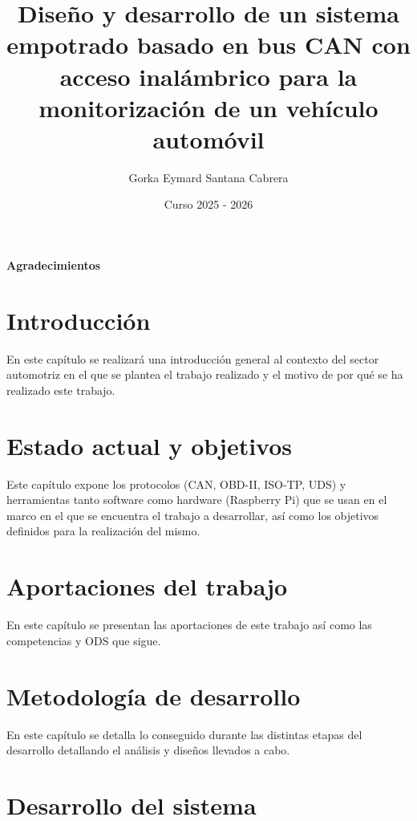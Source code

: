 \documentclass[oneside,12pt]{book}
\title{Diseño y desarrollo de un sistema empotrado basado en bus CAN con acceso inalámbrico para la monitorización de un vehículo automóvil}
\author{Gorka Eymard Santana Cabrera}
\date{Curso 2025 - 2026}
\begin{document}




\newpage
{}
{\Large{\textbf{Agradecimientos}}}


\clearpage

\tableofcontents

\lstlistoflistings
\listofalgorithms

\listoffigures

\listoftables


\clearpage
{}

\chapter{Introducción}
En este capítulo se realizará una introducción general al contexto del sector automotriz en el que se plantea el trabajo realizado y el motivo de por qué se ha realizado este trabajo.


\chapter{Estado actual y objetivos}
Este capítulo expone los protocolos (CAN, OBD-II, ISO-TP, UDS) y herramientas tanto software como hardware (Raspberry Pi) que se usan en el marco en el que se encuentra el trabajo a desarrollar, así como los objetivos definidos para la realización del mismo.


\chapter{Aportaciones del trabajo}
En este capítulo se presentan las aportaciones de este trabajo así como las competencias y ODS que sigue.


\chapter{Metodología de desarrollo}
En este capítulo se detalla lo conseguido durante las distintas etapas del desarrollo detallando el análisis y diseños llevados a cabo.


\chapter{Desarrollo del sistema}

\end{document}
